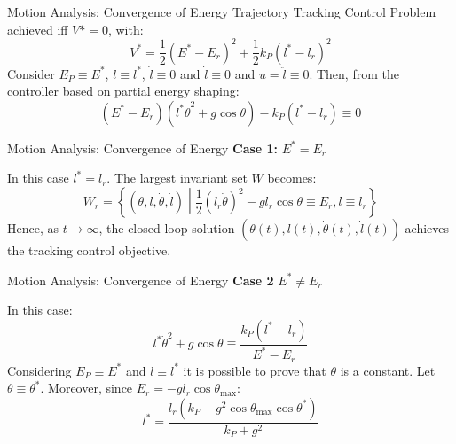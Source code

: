 \documentclass[10pt]{beamer}
\begin{document}
  \begin{frame}{Motion Analysis: Convergence of Energy}
    Trajectory Tracking Control Problem achieved iff $V*=0$, with:
    \begin{equation*}
      V^* = \frac{1}{2}(E^*-E_r)^2+\frac{1}{2}k_P(l^*-l_r)^2
    \end{equation*}
    Consider $E_P \equiv E^*$, $l \equiv l^*$, $\dot{l} \equiv 0$ and
    $\dot{l} \equiv 0$ and $u = \ddot{l} \equiv 0$. Then, from the controller
    based on partial energy shaping:
    \begin{equation*}
      (E^*-E_r)(l^*\dot{\theta}^2+g\cos\theta)-k_P(l^*-l_r) \equiv 0
    \end{equation*}
  \end{frame}

  \begin{frame}{Motion Analysis: Convergence of Energy}
    \noindent \textbf{Case 1:} $E^* = E_r$

    In this case $l^* = l_r$. The largest invariant set $W$ becomes:
    \begin{equation*}
      W_r = \left\{ (\theta, l, \dot{\theta}, \dot{l})
        \middle| \frac{1}{2} (l_r \dot{\theta})^2 -
        g l_r \cos\theta \equiv E_r, l \equiv l_r \right\}
    \end{equation*}
    Hence, as $t \to \infty$, the closed-loop solution
    $(\theta(t), l(t), \dot{\theta}(t), \dot{l}(t))$ achieves the
    tracking control objective.
  \end{frame}

  \begin{frame}{Motion Analysis: Convergence of Energy}
    \noindent \textbf{Case 2} $E^* \neq E_r$

    In this case:
    \begin{equation*}
      l^* \dot{\theta}^2 + g\cos\theta \equiv \frac{k_P(l^*-l_r)}{E^*-E_r}
    \end{equation*}
    Considering $E_P \equiv E^*$ and $l \equiv l^*$ it is possible to prove
    that $\theta$ is a constant. Let $\theta \equiv \theta^*$. Moreover,
    since $E_r = -g l_r \cos\theta_{\max}$:
    \begin{equation*}
      l^* = \frac{l_r(k_P+g^2\cos\theta_{\max}\cos\theta^*)}{k_P+g^2}
    \end{equation*}
  \end{frame}
\end{document}
